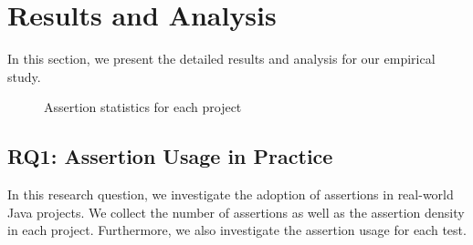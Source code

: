 \setlength{\textfloatsep}{1pt plus 1.0pt minus 2.0pt}
\section{Results and Analysis}
In this section, we present the detailed results and analysis for our empirical study.

\begin{figure*}[t]
\center
{}
\caption{Assertion statistics for each project}
\end{figure*}


\subsection{RQ1: Assertion Usage in Practice}

In this research question, we investigate the adoption of assertions
in real-world Java projects. We collect the number of assertions as
well as the assertion density in each project. Furthermore, we also
investigate the assertion usage for each test.


